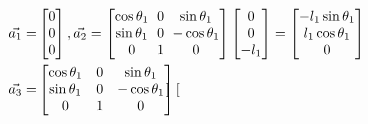 \documentclass[conference]{IEEEtran}
\begin{document}
\begin{align*}
    \vec{a_1} =                                                                        & \begin{bmatrix}
                                                                                             0 \\
                                                                                             0 \\
                                                                                             0
                                                                                         \end{bmatrix}, \hspace{0px}
    \vec{a_2} = { \setlength{\arraycolsep}{3pt}
    \begin{bmatrix}
        \cos \theta_1 & 0 & \sin \theta_1   \\
        \sin \theta_1 & 0 & - \cos \theta_1 \\
        0             & 1 & 0
    \end{bmatrix}
    \begin{bmatrix}
        0 \\
        0 \\
        -l_1
    \end{bmatrix} = \begin{bmatrix}
                        -l_1 \sin \theta_1 \\
                        l_1 \cos \theta_1  \\
                        0
                    \end{bmatrix}}                                                    &                                      \\
    \vec{a_3} =                                                                        & \begin{bmatrix}
                                                                                             \cos \theta_1 & 0 & \sin \theta_1   \\
                                                                                             \sin \theta_1 & 0 & - \cos \theta_1 \\
                                                                                             0             & 1 & 0
                                                                                         \end{bmatrix}
    \begin{bmatrix}

\end{bmatrix}
\end{align*}
\end{document}
